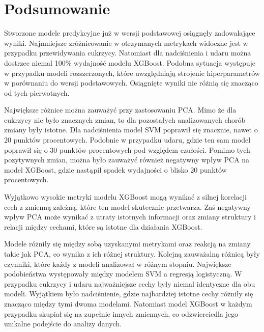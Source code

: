 \documentclass[onecolumn,12pt]{article}
\begin{document}
\section{Podsumowanie}
\noindent
Stworzone modele predykcyjne już w wersji podstawowej osiągnęły zadowalające wyniki. Najmniejsze zróżnicowanie w otrzymanych metrykach widoczne jest w przypadku przewidywania cukrzycy. Natomiast dla nadciśnienia i udaru można dostrzec niemal 100\% wydajność modelu XGBoost. Podobna sytuacja występuje w przypadku modeli rozszerzonych, które uwzględniają strojenie hiperparametrów w porównaniu do wersji podstawowych. Osiągnięte wyniki nie różnią się znacząco od tych pierwotnych.

\vspace{8pt}
\noindent
Największe różnice można zauważyć przy zastosowaniu PCA. Mimo że dla cukrzycy nie było znacznych zmian, to dla pozostałych analizowanych chorób zmiany były istotne. Dla nadciśnienia model SVM poprawił się znacznie, nawet o 20 punktów procentowych. Podobnie w przypadku udaru, gdzie ten sam model poprawił się o 30 punktów procentowych pod względem czułości. Pomimo tych pozytywnych zmian, można było zauważyć również negatywny wpływ PCA na model XGBoost, gdzie nastąpił spadek wydajności o blisko 20 punktów procentowych.

\vspace{8pt}
\noindent
Wyjątkowo wysokie metryki modelu XGBoost mogą wynikać z silnej korelacji cech z zmienną zależną, które ten model skutecznie przetwarza. Zaś negatywny wpływ PCA może wynikać z utraty istotnych informacji oraz zmiany struktury i relacji między cechami, które są istotne dla działania XGBoost.

\vspace{8pt}
\noindent
Modele różniły się między sobą uzyskanymi metrykami oraz reakcją na zmiany takie jak PCA, co wynika z ich różnej struktury. Kolejną zauważalną różnicą były czynniki, które każdy z modeli analizował w różnym stopniu. Największe podobieństwa występowały między modelem SVM a regresją logistyczną. W przypadku cukrzycy i udaru najważniejsze cechy były niemal identyczne dla obu modeli. Wyjątkiem było nadciśnienie, gdzie najbardziej istotne cechy różniły się znacząco między tymi dwoma modelami. Natomiast model XGBoost w każdym przypadku skupiał się na zupełnie innych zmiennych, co odzwierciedla jego unikalne podejście do analizy danych.

\begin{thebibliography}{9}
\end{thebibliography}
\end{document}
